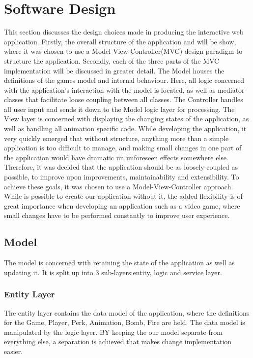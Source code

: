 \documentclass[]{article}
\begin{document}
\section{Software Design}
This section discusses the design choices made in producing the interactive web application. Firstly, the overall structure of the application and will be show, where it was chosen to use a Model-View-Controller(MVC) design paradigm to structure the application. Secondly, each of the three parts of the MVC implementation will be discussed in greater detail.
The Model houses the definitions of the games model and internal behaviour. Here, all logic concerned with the application's interaction with the model is located, as well as mediator classes that facilitate loose coupling between all classes.
The Controller handles all user input and sends it down to the Model logic layer for processing. The View layer is concerned with displaying the changing states of the application, as well as handling all animation specific code.
While developing the application, it very quickly emerged that without structure, anything more than a simple application is too difficult to manage, and making small changes in one part of the application would have dramatic un unforeseen effects somewhere else. Therefore, it was decided that the application should be as loosely-coupled as possible, to improve upon improvements, maintainability and extensibility. To achieve these goals, it was chosen to use a Model-View-Controller approach\cite{MVC}. 
While is possible to create our application without it, the added flexibility is of great importance when developing an application such as a video game, where small changes have to be performed constantly to improve user experience.

\subsection{Model}
The model is concerned with retaining the state of the application as well as updating it. It is split up into 3 sub-layers:entity, logic and service layer.

\subsubsection{Entity Layer}
The entity layer contains the data model of the application, where the definitions for the Game, Player, Perk, Animation, Bomb, Fire are held. The data model is manipulated by the logic layer. BY keeping the our model separate from everything else, a separation is achieved that makes change implementation easier. 
\end{document}
